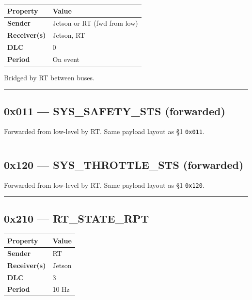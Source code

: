 \documentclass[12pt,a4paper,oneside]{report}
\begin{document}
\begin{longtable}[]{@{}ll@{}}
\toprule\noalign{}
Property & Value \\
\midrule\noalign{}
\endhead
\bottomrule\noalign{}
\endlastfoot
\textbf{Sender} & Jetson or RT (fwd from low) \\
\textbf{Receiver(s)} & Jetson, RT \\
\textbf{DLC} & 0 \\
\textbf{Period} & On event \\
\end{longtable}

Bridged by RT between buses.

\begin{center}\rule{0.5\linewidth}{0.5pt}\end{center}

\subsection{0x011 --- SYS\_SAFETY\_STS
(forwarded)}\label{x011-sys_safety_sts-forwarded}

Forwarded from low-level by RT. Same payload layout as §1 \texttt{0x011}.

\begin{center}\rule{0.5\linewidth}{0.5pt}\end{center}

\subsection{0x120 --- SYS\_THROTTLE\_STS
(forwarded)}\label{x120-sys_throttle_sts-forwarded}

Forwarded from low-level by RT. Same payload layout as §1 \texttt{0x120}.

\begin{center}\rule{0.5\linewidth}{0.5pt}\end{center}

\subsection{0x210 --- RT\_STATE\_RPT}\label{x210-rt_state_rpt}

\begin{longtable}[]{@{}ll@{}}
\toprule\noalign{}
Property & Value \\
\midrule\noalign{}
\endhead
\bottomrule\noalign{}
\endlastfoot
\textbf{Sender} & RT \\
\textbf{Receiver(s)} & Jetson \\
\textbf{DLC} & 3 \\
\textbf{Period} & 10 Hz \\
\end{longtable}
\end{document}
